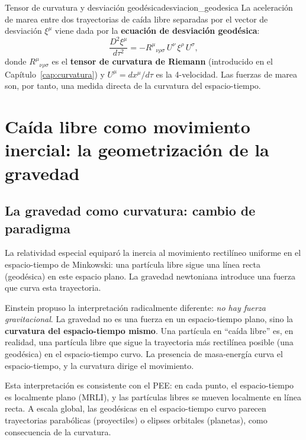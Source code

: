 \begin{definicion}{Tensor de curvatura y desviación geodésica}{desviacion_geodesica}
La aceleración de marea entre dos trayectorias de caída libre separadas por el vector de desviación $\xi^\mu$ viene dada por la \textbf{ecuación de desviación geodésica}:
\begin{equation}
  \frac{D^2\xi^\mu}{d\tau^2} = -R^\mu{}_{\nu\rho\sigma}\,U^\nu\,\xi^\rho\,U^\sigma,
  \label{eq:desviacion_geodesica}
\end{equation}
donde $R^\mu{}_{\nu\rho\sigma}$ es el \textbf{tensor de curvatura de Riemann} (introducido en el Capítulo~\ref{cap:curvatura}) y $U^\mu = dx^\mu/d\tau$ es la 4-velocidad. Las fuerzas de marea son, por tanto, una medida directa de la curvatura del espacio-tiempo.
\end{definicion}

\section{Caída libre como movimiento inercial: la geometrización de la gravedad}
\label{sec:geodesicas}

\subsection{La gravedad como curvatura: cambio de paradigma}

La relatividad especial equiparó la inercia al movimiento rectilíneo uniforme en el espacio-tiempo de Minkowski: una partícula libre sigue una línea recta (geodésica) en este espacio plano. La gravedad newtoniana introduce una fuerza que curva esta trayectoria.

Einstein propuso la interpretación radicalmente diferente: \emph{no hay fuerza gravitacional}. La gravedad no es una fuerza en un espacio-tiempo plano, sino la \textbf{curvatura del espacio-tiempo mismo}. Una partícula en ``caída libre'' es, en realidad, una partícula libre que sigue la trayectoria más rectilínea posible (una geodésica) en el espacio-tiempo curvo. La presencia de masa-energía curva el espacio-tiempo, y la curvatura dirige el movimiento.

Esta interpretación es consistente con el PEE: en cada punto, el espacio-tiempo es localmente plano (MRLI), y las partículas libres se mueven localmente en línea recta. A escala global, las geodésicas en el espacio-tiempo curvo parecen trayectorias parabólicas (proyectiles) o elipses orbitales (planetas), como consecuencia de la curvatura.

